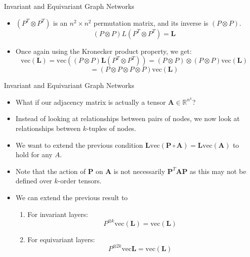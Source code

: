 \documentclass{beamer}
\begin{document}
\begin{frame}{Invariant and Equivariant Graph Networks}
    \begin{itemize}
        \setlength{\itemsep}{\fill}
        \item $(P^T\otimes P^T)$ is an $n^2 \times n^2$ permutation matrix, and its inverse is $(P\otimes P)$.
        \pause
        \[ (P\otimes P)L(P^T\otimes P^T) = \mathbf{L} \]
        \item Once again using the Kronecker product property, we get:
        \[ \text{vec}(\mathbf{L}) = \text{vec}\left((P\otimes P)\mathbf{L}(P^T\otimes P^T)\right) = (P\otimes P) \otimes (P \otimes P) \text{vec}(\mathbf{L}) \]
        \[ = (P \otimes P \otimes P \otimes P) \text{vec}(\mathbf{L}) \]
        \pause
        
        
    \end{itemize}
\end{frame}
\begin{frame}{Invariant and Equivariant Graph Networks}
    \begin{itemize}
        \setlength{\itemsep}{\fill}
        \item What if our adjacency matrix is actually a tensor $\mathbf{A} \in \mathbb{R}^{n^k}$?
        \item Instead of looking at relationships between pairs of nodes, we now look at relationships between $k$-tuples of nodes.
        \item We want to extend the previous condition \(\mathbf{L}\text{vec}(\boldsymbol{P} \circ \mathbf{A}) = \mathbf{L}\text{vec}(\mathbf{A})\) to hold for any $A$.
        \item Note that the action of $\boldsymbol{P}$ on $\mathbf{A}$ is not necessarily $\boldsymbol{P}^T \mathbf{A} \boldsymbol{P}$ as this may not be defined over $k$-order tensors. 
        \item We can extend the previous result to
        \begin{enumerate}
            \item For invariant layers: \[ P^{\otimes k}\text{vec}(\mathbf{L}) = \text{vec}(\mathbf{L}) \]
            \item For equivariant layers: \[ P^{\otimes 2k}\text{vec}\mathbf{L} = \text{vec}(\mathbf{L}) \]
        \end{enumerate}
    \end{itemize}
\end{frame}
\end{document}
